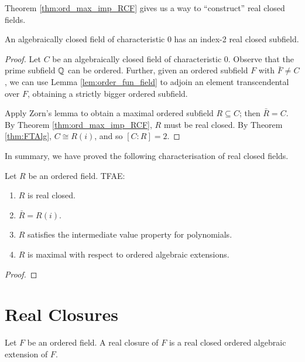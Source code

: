 Theorem \ref{thm:ord_max_imp_RCF} gives us a way to ``construct'' real closed fields.

\begin{lemma}
  \label{lem:ACF_ind_2_RCF}
  An algebraically closed field of characteristic 0 has an index-2 real closed subfield.
\end{lemma}
\begin{proof}
  Let $C$ be an algebraically closed field of characteristic 0. Observe that the prime subfield $\mathbb{Q}$ can be ordered. Further, given an ordered subfield $F$ with $\bar{F}\neq C$, we can use Lemma \ref{lem:order_fun_field} to adjoin an element transcendental over $F$, obtaining a strictly bigger ordered subfield.
  
  Apply Zorn's lemma to obtain a maximal ordered subfield $R\subseteq C$; then $\bar{R}=C$. By Theorem \ref{thm:ord_max_imp_RCF}, $R$ must be real closed. By Theorem \ref{thm:FTAlg}, $C\cong R(i)$, and so $[C:R]=2$.
\end{proof}

In summary, we have proved the following characterisation of real closed fields.

\begin{theorem}
  \label{thm:RCF_tfae}
  Let $R$ be an ordered field. TFAE:
  \begin{enumerate}
    \item $R$ is real closed.
    \item $\bar{R}=R(i)$.
    \item $R$ satisfies the intermediate value property for polynomials.
    \item $R$ is maximal with respect to ordered algebraic extensions.
  \end{enumerate}
\end{theorem}
\begin{proof}
\end{proof}

\section{Real Closures}

\begin{definition}
  \label{def:real_closure}
  \leanok
  Let $F$ be an ordered field. A real closure of $F$ is a real closed ordered algebraic extension of $F$.
\end{definition}

